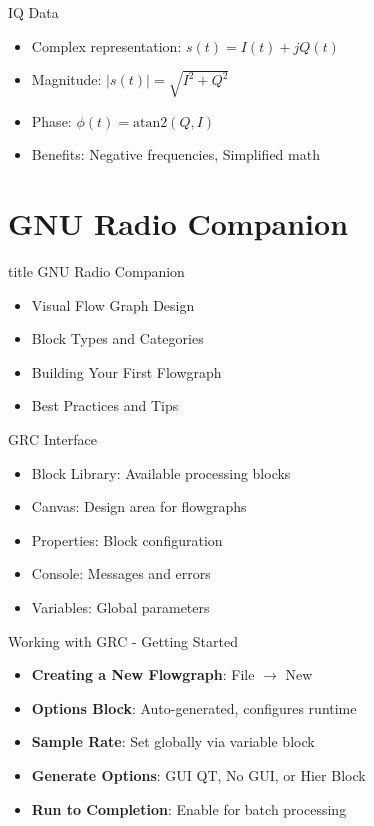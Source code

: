 \documentclass[aspectratio=169,11pt]{beamer}
\begin{document}
\begin{frame}{IQ Data}
\begin{itemize}
    \item Complex representation: $s(t) = I(t) + jQ(t)$
    \item Magnitude: $|s(t)| = \sqrt{I^2 + Q^2}$
    \item Phase: $\phi(t) = \text{atan2}(Q, I)$
    \item Benefits: Negative frequencies, Simplified math
\end{itemize}
\end{frame}

\section{GNU Radio Companion}

\begin{frame}[plain]
\vfill
\centering
\begin{beamercolorbox}[sep=8pt,center,shadow=true,rounded=true]{title}
\Large GNU Radio Companion\par
\end{beamercolorbox}
\vfill
\begin{itemize}
    \item Visual Flow Graph Design
    \item Block Types and Categories
    \item Building Your First Flowgraph
    \item Best Practices and Tips
\end{itemize}
\vfill
\end{frame}

\begin{frame}{GRC Interface}
\begin{itemize}
    \item Block Library: Available processing blocks
    \item Canvas: Design area for flowgraphs
    \item Properties: Block configuration
    \item Console: Messages and errors
    \item Variables: Global parameters
\end{itemize}
\end{frame}


\begin{frame}{Working with GRC - Getting Started}
\begin{itemize}
    \item \textbf{Creating a New Flowgraph}: File $\rightarrow$ New
    \item \textbf{Options Block}: Auto-generated, configures runtime
    \item \textbf{Sample Rate}: Set globally via variable block
    \item \textbf{Generate Options}: GUI QT, No GUI, or Hier Block
    \item \textbf{Run to Completion}: Enable for batch processing
\end{itemize}
\end{frame}
\end{document}
